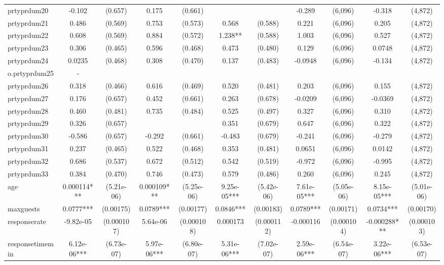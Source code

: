 \documentclass[]{article}
\begin{document}
\begin{tabular}{lcccccccccc}
prtyprdum20 & -0.102 & (0.657) & 0.175 & (0.661) &  &  & -0.289 & (6,096) & -0.318 & (4,872) \\
prtyprdum21 & 0.486 & (0.569) & 0.753 & (0.573) & 0.568 & (0.588) & 0.221 & (6,096) & 0.205 & (4,872) \\
prtyprdum22 & 0.608 & (0.569) & 0.884 & (0.572) & 1.238** & (0.588) & 1.003 & (6,096) & 0.527 & (4,872) \\
prtyprdum23 & 0.306 & (0.465) & 0.596 & (0.468) & 0.473 & (0.480) & 0.129 & (6,096) & 0.0748 & (4,872) \\
prtyprdum24 & 0.0235 & (0.468) & 0.308 & (0.470) & 0.137 & (0.483) & -0.0948 & (6,096) & -0.134 & (4,872) \\
o.prtyprdum25 & - &  &  &  &  &  &  &  &  &  \\
prtyprdum26 & 0.318 & (0.466) & 0.616 & (0.469) & 0.520 & (0.481) & 0.203 & (6,096) & 0.155 & (4,872) \\
prtyprdum27 & 0.176 & (0.657) & 0.452 & (0.661) & 0.263 & (0.678) & -0.0209 & (6,096) & -0.0369 & (4,872) \\
prtyprdum28 & 0.460 & (0.481) & 0.735 & (0.484) & 0.525 & (0.497) & 0.327 & (6,096) & 0.310 & (4,872) \\
prtyprdum29 & 0.326 & (0.657) &  &  & 0.351 & (0.679) & 0.647 & (6,096) & 0.322 & (4,872) \\
prtyprdum30 & -0.586 & (0.657) & -0.292 & (0.661) & -0.483 & (0.679) & -0.241 & (6,096) & -0.279 & (4,872) \\
prtyprdum31 & 0.237 & (0.465) & 0.522 & (0.468) & 0.353 & (0.481) & 0.0651 & (6,096) & 0.0142 & (4,872) \\
prtyprdum32 & 0.686 & (0.537) & 0.672 & (0.512) & 0.542 & (0.519) & -0.972 & (6,096) & -0.995 & (4,872) \\
prtyprdum33 & 0.384 & (0.470) & 0.746 & (0.473) & 0.579 & (0.486) & 0.260 & (6,096) & 0.245 & (4,872) \\
age & 0.000114*** & (5.21e-06) & 0.000109*** & (5.25e-06) & 9.25e-05*** & (5.42e-06) & 7.61e-05*** & (5.05e-06) & 8.15e-05*** & (5.01e-06) \\
maxguests & 0.0777*** & (0.00175) & 0.0789*** & (0.00177) & 0.0846*** & (0.00183) & 0.0789*** & (0.00171) & 0.0734*** & (0.00170) \\
responserate & -9.82e-05 & (0.000107) & 5.64e-06 & (0.000108) & 0.000173 & (0.000112) & -0.000116 & (0.000104) & -0.000288*** & (0.000103) \\
responsetimemin & 6.12e-06*** & (6.73e-07) & 5.97e-06*** & (6.80e-07) & 5.31e-06*** & (7.02e-07) & 2.59e-06*** & (6.54e-07) & 3.22e-06*** & (6.53e-07) \\

\end{tabular}
\end{document}
